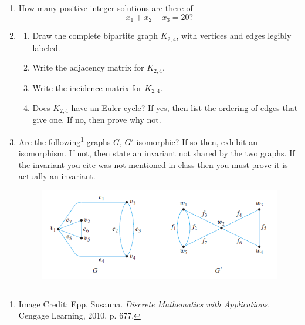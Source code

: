 \documentclass[12pt,letterpaper]{article}
\begin{document}
\begin{enumerate}
\vspace{25pc}
\item How many positive integer solutions are there of
\[x_1+x_2+x_3=20?\]

\newpage
\item \begin{enumerate}
\item Draw the complete bipartite graph $K_{2,4}$, with vertices and edges legibly labeled.

\vspace{12pc}
\item Write the adjacency matrix for $K_{2,4}$.

\vspace{12pc}
\item Write the incidence matrix for $K_{2,4}$.

\vspace{12pc}
\item Does $K_{2,4}$ have an Euler cycle?  If yes, then list the ordering of edges that give one.  If no, then prove why not.

\end{enumerate}


\newpage
\item Are the following\footnote{Image Credit: Epp, Susanna. {\it Discrete Mathematics with Applications}.  Cengage Learning, 2010.  p. 677.} graphs $G$, $G'$ isomorphic?  If so then, exhibit an isomorphism.  If not, then state an invariant not shared by the two graphs.  If the invariant you cite was not mentioned in class then you must prove it is actually an invariant.  
\vspace{-1pc}  
\begin{figure}[h]
\begin{center}
\includegraphics*[scale=0.9]{Exam3EppIso.png}
\end{center}
\end{figure}


\end{enumerate}
\end{document}

